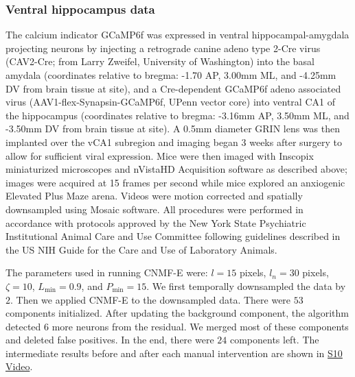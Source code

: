 \documentclass[9pt,lineno]{elife}
\begin{document}
\subsubsection{Ventral hippocampus data}
The calcium indicator GCaMP6f was expressed in ventral hippocampal-amygdala projecting neurons by injecting a retrograde canine adeno type 2-Cre virus (CAV2-Cre; from Larry Zweifel, University of Washington) into the basal amydala (coordinates relative to bregma:  -1.70 AP, 3.00mm ML, and -4.25mm DV from brain tissue at site), and a Cre-dependent GCaMP6f adeno associated virus (AAV1-flex-Synapsin-GCaMP6f, UPenn vector core) into ventral CA1 of the hippocampus (coordinates relative to bregma: -3.16mm AP, 3.50mm ML, and -3.50mm DV from brain tissue at site). A 0.5mm diameter GRIN lens was then implanted over the vCA1 subregion and imaging began 3 weeks after surgery to allow for sufficient viral expression. Mice were then imaged with Inscopix miniaturized microscopes and nVistaHD Acquisition software as described above; images were acquired at 15 frames per second while mice explored an anxiogenic Elevated Plus Maze arena. Videos were motion corrected and spatially downsampled using Mosaic software. All procedures were performed in accordance with protocols approved by the New York State Psychiatric Institutional Animal Care and Use Committee following guidelines described in the US NIH Guide for the Care and Use of Laboratory Animals. 

The parameters used in running CNMF-E were:  $l=15$ pixels, $l_n=30$ pixels, $\zeta=10$, $L_{\min}=0.9$, and $P_{\min}=15$. We first temporally downsampled the data by $2$. Then we applied CNMF-E to the downsampled data. There were $53$ components initialized. After updating the background component, the algorithm detected 6 more neurons from the residual. We merged most of these components and deleted false positives. In the end, there were $24$ components left. The intermediate results before and after each manual intervention are shown in \href{http://www.columbia.edu/~pz2230/videos/intervention_results.mp4}{S10 Video}.  %
\end{document}
